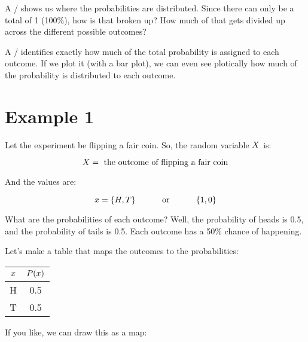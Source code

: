 \documentclass[../../../main.tex]{subfiles}
\begin{document}
A \PDFtext/ shows us where the probabilities are distributed. Since there can only be a total of 1 (100\%), how is that broken up? How much of that gets divided up across the different possible outcomes?

A \PDFtext/ identifies exactly how much of the total probability is assigned to each outcome. If we plot it (with a bar plot), we can even see plotically how much of the probability is distributed to each outcome.


\section{Example 1}

Let the experiment be flipping a fair coin. So, the random variable $\RandVar/$ is:

\begin{equation*}
    \RandVar/ = \text{ the outcome of flipping a fair coin}
\end{equation*}

\noindent
And the values are:

\begin{equation*}
    \RandVarVal/ = \{ H, T \} \hskip 1cm \text{ or } \hskip 1cm \{ 1, 0 \}
\end{equation*}

\noindent
What are the probabilities of each outcome? Well, the probability of heads is 0.5, and the probability of tails is 0.5. Each outcome has a 50\% chance of happening.

Let's make a table that maps the outcomes to the probabilities:

\begin{center}
  \begin{tabular}{| c | c |}
    \hline
    $\RandVarVal/$ & $\Probability{\RandVarVal/}$ \\ \hline
               H & 0.5 \\ \hline
               T & 0.5 \\ \hline
  \end{tabular}
\end{center}

\noindent
If you like, we can draw this as a map:

\begin{center}\end{center}
\end{document}

